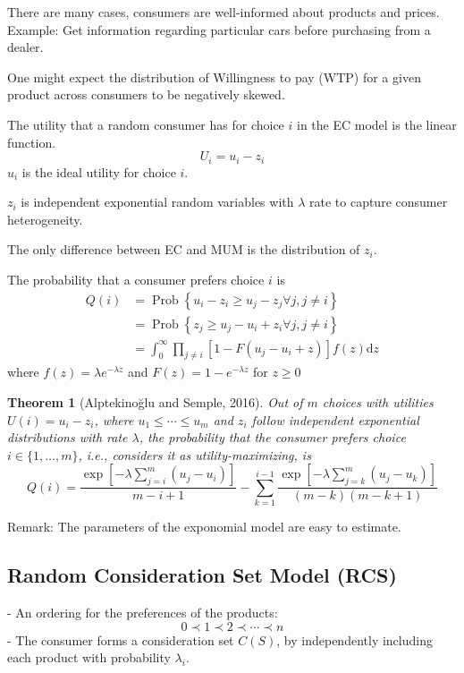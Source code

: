 \documentclass[11pt,a4paper]{article}
\newtheorem{theorem}{Theorem}
\begin{document}
There are many cases, consumers are well-informed about products and prices.
Example: Get information regarding particular cars before purchasing from a dealer.

One might expect the distribution of Willingness to pay (WTP) for a given product across consumers to be negatively skewed.

The utility that a random consumer has for choice $i$ in the EC model is the linear function. $$U_i=u_i-z_i$$
$u_i$ is the ideal utility for choice $i$.

$z_i$ is independent exponential random variables with $\lambda$ rate to capture consumer heterogeneity.

The only difference between EC and MUM is the distribution of $z_i$.

The probability that a consumer prefers choice $i$ is
$$
\begin{aligned}
Q(i) &=\operatorname{Prob}\left\{u_{i}-z_{i} \geq u_{j}-z_{j} \forall j, j \neq i\right\} \\
&=\operatorname{Prob}\left\{z_{j} \geq u_{j}-u_{i}+z_{i} \forall j, j \neq i\right\} \\
&=\int_{0}^{\infty} \prod_{j \neq i}\left[1-F\left(u_{j}-u_{i}+z\right)\right] f(z) \mathrm{d} z
\end{aligned}
$$
where $f(z)=\lambda e^{-\lambda z}$ and $F(z)=1-e^{-\lambda z}$ for $z \geq 0$

\begin{theorem}[Alptekinoğlu and Semple, 2016]
    Out of $m$ choices with utilities $U(i)=u_{i}-z_{i}$, where $u_{1} \leq \cdots \leq u_{m}$ and $z_{i}$ follow independent exponential distributions with rate $\lambda$, the probability that the consumer prefers choice $i \in\{1, \ldots, m\}$, i.e., considers it as utility-maximizing, is
    $$
    Q(i)=\frac{\exp \left[-\lambda \sum_{j=i}^{m}\left(u_{j}-u_{i}\right)\right]}{m-i+1}-\sum_{k=1}^{i-1} \frac{\exp \left[-\lambda \sum_{j=k}^{m}\left(u_{j}-u_{k}\right)\right]}{(m-k)(m-k+1)}
    $$
\end{theorem}
Remark: The parameters of the exponomial model are easy to estimate.

\subsection{Random Consideration Set Model (RCS)}
- An ordering for the preferences of the products:
$$
0 \prec 1 \prec 2 \prec \cdots \prec n
$$
- The consumer forms a consideration set $C(S)$, by independently including each product with probability $\lambda_{i}$.
\end{document}
